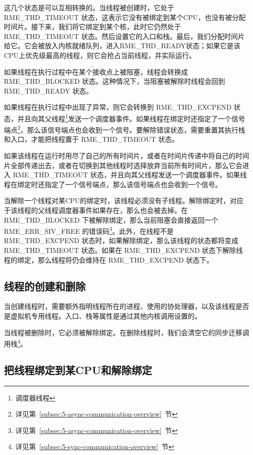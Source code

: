 这几个状态是可以互相转换的。当线程被创建时，它处于 RME\_THD\_TIMEOUT 状态，这表示它没有被绑定到某个CPU，也没有被分配时间片。接下来，我们将它绑定到某个核，此时它仍然处于 RME\_THD\_TIMEOUT 状态。然后设置它的入口和栈。最后，我们分配时间片给它。它会被放入内核就绪队列，进入RME\_THD\_READY状态；如果它是该CPU上优先级最高的线程，则它会抢占当前线程，并实际运行。

如果线程在执行过程中在某个接收点上被阻塞，线程会转换成 RME\_THD\_BLOCKED 状态。这种情况下，当阻塞被解除时线程会回到 RME\_THD\_READY 状态。

如果线程在执行过程中出现了异常，则它会转换到 RME\_THD\_EXCPEND 状态，并且向其父线程\footnote{调度器线程}发送一个调度器事件。如果线程在绑定时还指定了一个信号端点\footnote{详见第~\ref{subsec:5-async-communication-overview}~节}，那么该信号端点也会收到一个信号。要解除错误状态，需要重置其执行栈和入口，才能把线程置于 RME\_THD\_TIMEOUT 状态。

如果该线程在运行时用尽了自己的所有时间片，或者在时间片传递中将自己的时间片全部传递出去，或者在切换到其他线程时选择放弃当前所有时间片，那么它会进入 RME\_THD\_TIMEOUT 状态，并且向其父线程发送一个调度器事件。如果线程在绑定时还指定了一个信号端点，那么该信号端点也会收到一个信号。

当解除一个线程对某CPU的绑定时，该线程必须没有子线程。解除绑定时，对应于该线程的父线程调度器事件如果存在，那么也会被去掉。在 RME\_THD\_BLOCKED 下被解除绑定，那么当前阻塞会直接返回一个 RME\_ERR\_SIV\_FREE 的错误码\footnote{详见第~\ref{subsec:5-async-communication-overview}~节}。此外，在线程不是 RME\_THD\_EXCPEND 状态时，如果解除绑定，那么该线程的状态都将变成 RME\_THD\_TIMEOUT 状态。如果在 RME\_THD\_EXCPEND 状态下解除线程的绑定，那么线程将仍会维持在 RME\_THD\_EXCPEND 状态下。

\subsection{线程的创建和删除}\label{subsec:4-thread-creation-and-deletion}

当创建线程时，需要额外指明线程所在的进程、使用的协处理器，以及该线程是否是虚拟机专用线程。入口、栈等属性是通过其他内核调用设置的。

当线程被删除时，它必须被解除绑定。在删除线程时，我们会清空它的同步迁移调用栈\footnote{详见第~\ref{subsec:5-sync-communication-overview}~节}。

\subsection{把线程绑定到某CPU和解除绑定}\label{subsec:4-bind-thread-to-cpu-and-unbind}

